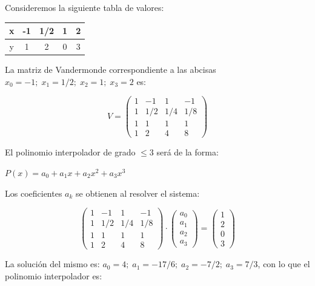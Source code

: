 \begin{multicols}{2}
Consideremos la siguiente tabla de valores:

\begin{table}[H]
\centering
\begin{tabular}{|c|c|c|c|c|}
\hline
x & -1 & 1/2 & 1 & 2 \\ \hline
y & 1  & 2   & 0 & 3 \\ \hline
\end{tabular}
\end{table}
\end{multicols}

La matriz de Vandermonde correspondiente a las abcisas $x_0=-1; \; x_1=1/2; \; x_2=1; \; x_3=2$ es:

\begin{equation*}
	V=
	\left( \begin{matrix}
 	1&-1&1&-1\\
 	1&1/2&1/4&1/8 \\
 	1&1&1&1 \\
 	1&2&4&8
 \end{matrix} \right) 
\end{equation*}

El polinomio interpolador de grado $\le 3$ será de la forma:

\vspace{2mm} \centerline{$P(x)=a_0+a_1x+a_2x^2+a_3x^3$}

Los coeficientes $a_k$ se obtienen al resolver el sistema:

\begin{equation*}
	\left( \begin{matrix}
 	1&-1&1&-1\\
 	1&1/2&1/4&1/8 \\
 	1&1&1&1 \\
 	1&2&4&8
 \end{matrix} \right) \cdot
 \left( \begin{matrix}
 	a_0\\a_1\\ a_2 \\a_3
 \end{matrix} \right) =
 \left( \begin{matrix}
 	1\\2\\ 0 \\3
 \end{matrix} \right)
\end{equation*}

La solución del mismo es: $a_0=4; \; a_1=-17/6; \; a_2=-7/2; \; a_3=7/3$, con lo que el polinomio interpolador es:

